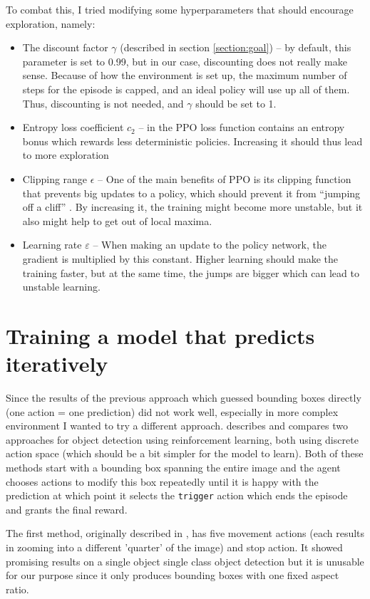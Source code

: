 \documentclass[
  digital,     %
  oneside,     %
  nosansbold,  %
  nocolorbold, %
  lof,         %
  lot,         %
]{fithesis4}
\begin{document}
To combat this, I tried modifying some hyperparameters that should encourage exploration, namely:
\begin{itemize}
    \item The discount factor $\gamma$ (described in section \ref{section:goal}) -- by default, this parameter is set to 0.99, but in our case, discounting does not really make sense. Because of how the environment is set up, the maximum number of steps for the episode is capped, and an ideal policy will use up all of them. Thus, discounting is not needed, and $\gamma$ should be set to 1.
    \item Entropy loss coefficient $c_2$ -- in the PPO loss function contains an entropy bonus which rewards less deterministic policies. Increasing it should thus lead to more exploration \cite{PPO_paper}
    \item Clipping range $\epsilon$ -- One of the main benefits of PPO is its clipping function that prevents big updates to a policy, which should prevent it from \enquote{jumping off a cliff} \cite{PPO_paper}. By increasing it, the training might become more unstable, but it also might help to get out of local maxima.
    \item Learning rate $\varepsilon$ -- When making an update to the policy network, the gradient is multiplied by this constant. Higher learning should make the training faster, but at the same time, the jumps are bigger which can lead to unstable learning.
\end{itemize}

\chapter{Training a model that predicts iteratively}
\label{chap:iterative}

Since the results of the previous approach which guessed bounding boxes directly (one action = one prediction) did not work well, especially in more complex environment I wanted to try a different approach. \cite{rl_object_detection} describes and compares two approaches for object detection using reinforcement learning, both using discrete action space (which should be a bit simpler for the model to learn). Both of these methods start with a bounding box spanning the entire image and the agent chooses actions to modify this box repeatedly until it is happy with the prediction at which point it selects the \texttt{trigger} action which ends the episode and grants the final reward.

The first method, originally described in \cite{hierarchical_od_with_drl}, has five movement actions (each results in zooming into a different 'quarter' of the image) and stop action. It showed promising results on a single object single class object detection but it is unusable for our purpose since it only produces bounding boxes with one fixed aspect ratio.
\end{document}
